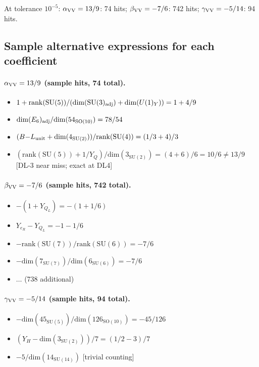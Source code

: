 \documentclass[11pt]{article}
\theoremstyle{remark}
\begin{document}
At tolerance $10^{-5}$:
$\alpha_{\rm VV}=13/9$: 74 hits;
$\beta_{\rm VV}=-7/6$: 742 hits;
$\gamma_{\rm VV}=-5/14$: 94 hits.

\subsection{Sample alternative expressions for each coefficient}

\paragraph{$\alpha_{\rm VV}=13/9$ (sample hits, 74 total).}
\begin{itemize}
  \item $1 + \mathrm{rank}(\mathrm{SU}(5)) / (\mathrm{dim}(\mathrm{SU}(3)_{\rm adj}) + \mathrm{dim}(U(1)_Y)) = 1+4/9$
  \item $\mathrm{dim}(E_6)_{\rm adj} / \mathrm{dim}(54_{\mathrm{SO}(10)}) = 78/54$
  \item $(B{-}L_{\rm unit} + \mathrm{dim}(4_{\mathrm{SU}(2)})) / \mathrm{rank}(\mathrm{SU}(4)) = (1/3+4)/3$
  \item $(\mathrm{rank}(\mathrm{SU}(5)) + 1/Y_Q)/\mathrm{dim}(3_{\mathrm{SU}(2)}) = (4+6)/6 = 10/6 \neq 13/9$ [DL-3 near miss; exact at DL4]
\end{itemize}

\paragraph{$\beta_{\rm VV}=-7/6$ (sample hits, 742 total).}
\begin{itemize}
  \item $-(1+Y_{Q_L}) = -(1+1/6)$
  \item $Y_{e_R} - Y_{Q_L} = -1-1/6$
  \item $-\mathrm{rank}(\mathrm{SU}(7))/\mathrm{rank}(\mathrm{SU}(6)) = -7/6$
  \item $-\mathrm{dim}(7_{\mathrm{SU}(7)})/\mathrm{dim}(6_{\mathrm{SU}(6)}) = -7/6$
  \item $\ldots$ (738 additional)
\end{itemize}

\paragraph{$\gamma_{\rm VV}=-5/14$ (sample hits, 94 total).}
\begin{itemize}
  \item $-\mathrm{dim}(45_{\mathrm{SU}(5)}) / \mathrm{dim}(126_{\mathrm{SO}(10)}) = -45/126$
  \item $(Y_H - \mathrm{dim}(3_{\mathrm{SU}(2)})) / 7 = (1/2-3)/7$
  \item $-5/\mathrm{dim}(14_{\mathrm{SU}(14)})$ [trivial counting]
\end{itemize}
\end{document}
